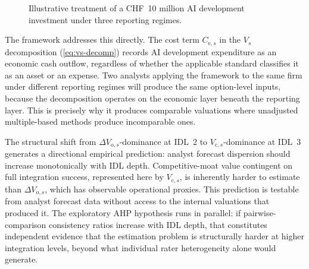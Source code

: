 \documentclass[oneside,10pt]{swissi}
\begin{document}
\begin{figure}[htbp]
\centering
{}
\caption{Illustrative treatment of a CHF~10 million AI development investment under three reporting regimes.}
\label{fig:accounting-treatment}
\end{figure}

The framework addresses this directly. The cost term $C_{\mathrm{e},s}$ in the $V_s$ decomposition (\cref{eq:vs-decomp}) records AI development expenditure as an economic cash outflow, regardless of whether the applicable standard classifies it as an asset or an expense. Two analysts applying the framework to the same firm under different reporting regimes will produce the same option-level inputs, because the decomposition operates on the economic layer beneath the reporting layer. This is precisely why it produces comparable valuations where unadjusted multiple-based methods produce incomparable ones.

The structural shift from $\Delta V_{\mathrm{o},s}$-dominance at IDL~2 to $V_{\mathrm{c},s}$-dominance at IDL~3 generates a directional empirical prediction: analyst forecast dispersion should increase monotonically with IDL depth. Competitive-moat value contingent on full integration success, represented here by $V_{\mathrm{c},s}$, is inherently harder to estimate than $\Delta V_{\mathrm{o},s}$, which has observable operational proxies. This prediction is testable from analyst forecast data without access to the internal valuations that produced it. The exploratory AHP hypothesis runs in parallel: if pairwise-comparison consistency ratios increase with IDL depth, that constitutes independent evidence that the estimation problem is structurally harder at higher integration levels, beyond what individual rater heterogeneity alone would generate.
\end{document}
